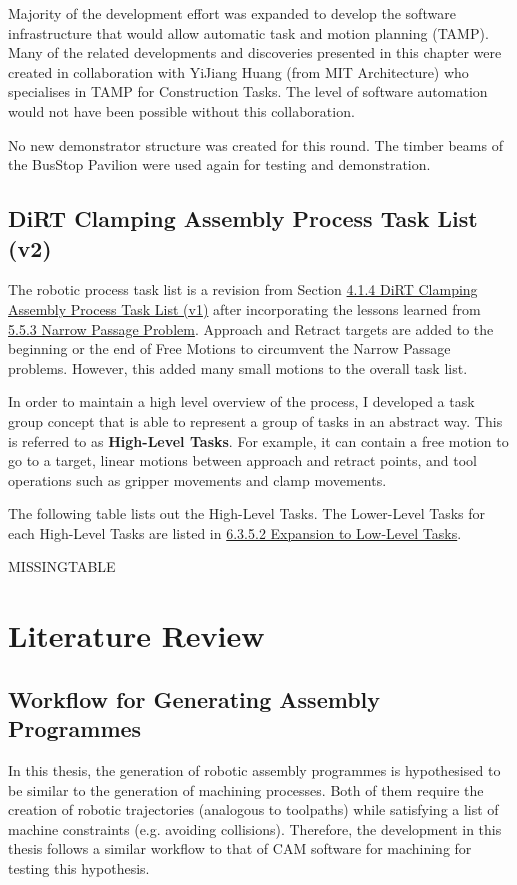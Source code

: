 Majority of the development effort was expanded to develop the software infrastructure that would allow automatic task and motion planning (TAMP). Many of the related developments and discoveries presented in this chapter were created in collaboration with YiJiang Huang (from MIT Architecture) who specialises in TAMP for Construction Tasks. The level of software automation would not have been possible without this collaboration.

No new demonstrator structure was created for this round. The timber beams of the BusStop Pavilion were used again for testing and demonstration. 

\subsection{DiRT Clamping Assembly Process Task List (v2)}

The robotic process task list is a revision from Section \ul{4.1.4 DiRT Clamping Assembly Process Task List (v1)} after incorporating the lessons learned from \ul{5.5.3 Narrow Passage Problem}. Approach and Retract targets are added to the beginning or the end of Free Motions to circumvent the Narrow Passage problems. However, this added many small motions to the overall task list.

In order to maintain a high level overview of the process, I developed a task group concept that is able to represent a group of tasks in an abstract way. This is referred to as \textbf{High-Level Tasks}. For example, it can contain a free motion to go to a target, linear motions between approach and retract points, and tool operations such as gripper movements and clamp movements. 

The following table lists out the High-Level Tasks. The Lower-Level Tasks for each High-Level Tasks are listed in \ul{6.3.5.2 Expansion to Low-Level Tasks}. 

MISSINGTABLE

\section{Literature Review}

\subsection{Workflow for Generating Assembly Programmes}

In this thesis, the generation of robotic assembly programmes is hypothesised to be similar to the generation of machining processes. Both of them require the creation of robotic trajectories (analogous to toolpaths) while satisfying a list of machine constraints (e.g. avoiding collisions). Therefore, the development in this thesis follows a similar workflow to that of CAM software for machining for testing this hypothesis.

